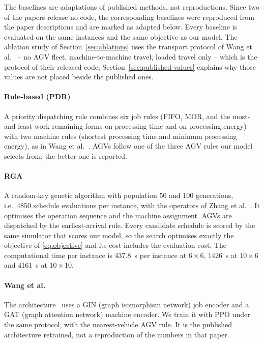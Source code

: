 The baselines are adaptations of published methods, not reproductions. Since two of the papers release no code,
the corresponding baselines were reproduced from the paper descriptions and are marked as adapted below.
Every baseline is evaluated on the same instances and the same objective as our model. The ablation study of
Section~\ref{sec:ablations} uses the transport protocol of Wang et al.~\cite{wang2025multitarget} --
no AGV fleet, machine-to-machine travel, loaded travel only -- which is the protocol of their released code;
Section~\ref{sec:published-values} explains why those values are not placed beside the published ones.

\paragraph{Rule-based (PDR)} A priority dispatching rule combines six job rules (FIFO,
MOR, and the most- and least-work-remaining forms on processing time and on
processing energy) with two machine rules (shortest processing time and
minimum processing energy), as in Wang et
al.~\cite{wang2025multitarget}. AGVs follow one of the three AGV rules our model selects from; the better one is reported.

\paragraph{RGA} A random-key genetic algorithm with population 50 and 100
generations, i.e.\ 4850 schedule evaluations per instance, with the operators
of Zhang et al.~\cite{zhang2011rga}. It optimises the operation sequence and
the machine assignment. AGVs are dispatched by the earliest-arrival rule.
Every candidate schedule is scored by the same simulator that scores our model, so the search optimises exactly the objective of
\eqref{eq:objective} and its cost includes the evaluation cost. The computational time per instance is 
437.8~s per instance at $6\times6$, 1426~s at $10\times6$ and 4161~s at
$10\times10$.

\paragraph{Wang et al.} The
architecture~\cite{wang2025multitarget} uses a GIN (graph isomorphism network)
job encoder and a GAT (graph attention network) machine encoder. We train it with PPO under the same protocol, with the nearest-vehicle
AGV rule. It is the published architecture retrained, not a reproduction of
the numbers in that paper.

